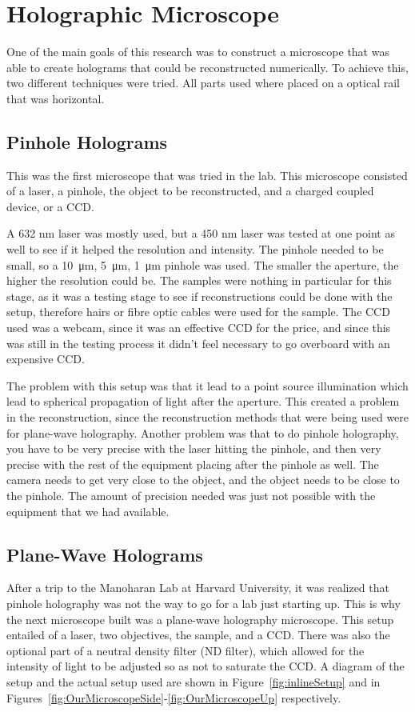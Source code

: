 


\chapter{Holographic Microscope} \label{chap:Micro}

One of the main goals of this research was to construct a microscope that was
able to create holograms that could be reconstructed numerically. To achieve
this, two different techniques were tried. All parts used where placed on a
optical rail that was horizontal.

\section{Pinhole Holograms}
This was the first microscope that was tried in the lab. This microscope
consisted of a laser, a pinhole, the object to be reconstructed, and a charged
coupled device, or a CCD.

A 632 nm laser was mostly used, but a 450 nm laser was tested at one point as
well to see if it helped the resolution and intensity. The pinhole needed to be
small, so a \SI{10}{\micro\meter}, \SI{5}{\micro\meter}, \SI{1}{\micro\meter} pinhole was used. The smaller the
aperture, the higher the resolution could be. The samples were nothing in
particular for this stage, as it was a testing stage to see if reconstructions
could be done with the setup, therefore hairs or fibre optic cables were used
for the sample. The CCD used was a webcam, since it was an effective CCD for
the price, and since this was still in the testing process it didn't feel
necessary to go overboard with an expensive CCD.

The problem with this setup was that it lead to a point source illumination
which lead to spherical propagation of light after the aperture. This created
a problem in the reconstruction, since the reconstruction methods that were
being used were for plane-wave holography. Another problem was that to do
pinhole holography, you have to be very precise with the laser hitting the
pinhole, and then very precise with the rest of the equipment placing after the
pinhole as well. The camera needs to get very close to the object, and the
object needs to be close to the pinhole. The amount of precision needed was
just not possible with the equipment that we had available.


\section{Plane-Wave Holograms}
After a trip to the Manoharan Lab at Harvard University, it was realized that
pinhole holography was not the way to go for a lab just starting up. This is
why the next microscope built was a plane-wave holography microscope. This
setup entailed of a laser, two objectives, the sample, and a CCD\@. There was
also the optional part of a neutral density filter (ND filter), which allowed for the
intensity of light to be adjusted so as not to saturate the CCD\@. A diagram of
the setup and the actual setup used are shown in Figure~\ref{fig:inlineSetup}
and in Figures~\ref{fig:OurMicroscopeSide}-\ref{fig:OurMicroscopeUp} respectively.

